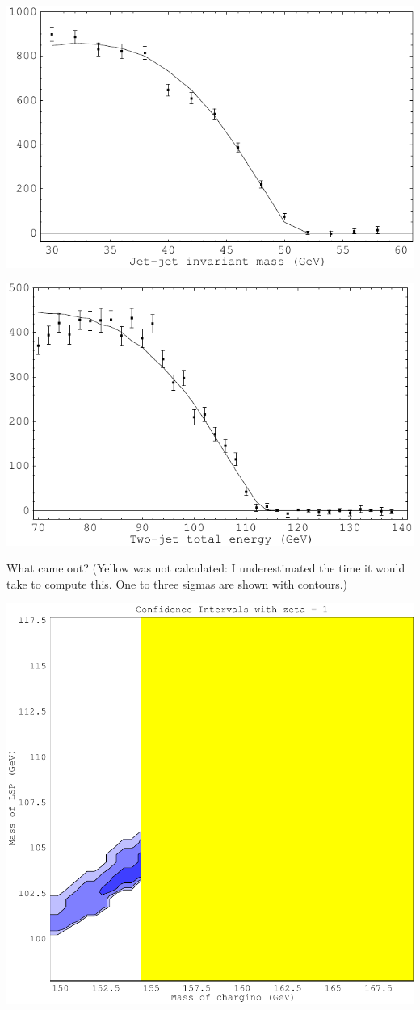 \documentclass[landscape]{article}
\begin{document}
\vfill

\begin{center} \includegraphics[width=0.5\linewidth]{fakeit2_mass.pdf} \end{center}

\vfill

\begin{center} \includegraphics[width=0.5\linewidth]{fakeit2_energy.pdf} \end{center}

\pagebreak

What came out?  (Yellow was not calculated: I underestimated the time it would take to compute this.  One to three sigmas are shown with contours.)

\vfill

\begin{center}\includegraphics[width=0.7\linewidth]{fakeit2_chisquare_tmpbowl.pdf}\end{center}
\end{document}

